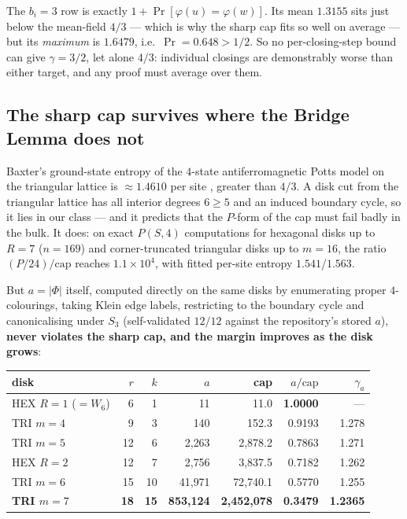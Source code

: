 \documentclass[11pt]{article}
\theoremstyle{definition}
\begin{document}
The $b_i=3$ row is exactly $1+\Pr[\varphi(u)=\varphi(w)]$. Its mean $1.3155$ sits
just below the mean-field $4/3$ --- which is why the sharp cap fits so well on average
--- but its \emph{maximum} is $1.6479$, i.e.\ $\Pr = 0.648 > 1/2$. So no per-closing-step
bound can give $\gamma=3/2$, let alone $4/3$: individual closings are demonstrably
worse than either target, and any proof must average over them.

\subsection{The sharp cap survives where the Bridge Lemma does not}

Baxter's ground-state entropy of the $4$-state antiferromagnetic Potts model on the
triangular lattice is $\approx 1.4610$ per site \cite{baxter1987}, greater than
$4/3$. A disk cut from the triangular lattice has all interior degrees $6 \ge 5$ and
an induced boundary cycle, so it lies in our class --- and it predicts that the
$P$-form of the cap must fail badly in the bulk. It does: on exact $P(S,4)$
computations for hexagonal disks up to $R=7$ ($n=169$) and corner-truncated
triangular disks up to $m=16$, the ratio $(P/24)/\text{cap}$ reaches
$1.1\times10^4$, with fitted per-site entropy $1.541$/$1.563$.

But $a=|\Phi|$ itself, computed directly on the same disks by enumerating proper
$4$-colourings, taking Klein edge labels, restricting to the boundary cycle and
canonicalising under $S_3$ (self-validated $12/12$ against the repository's stored
$a$), \textbf{never violates the sharp cap, and the margin improves as the disk
grows}:

\begin{center}\small
\begin{tabular}{lrrrrrr}
\toprule
disk & $r$ & $k$ & $a$ & cap & $a/\text{cap}$ & $\gamma_a$ \\
\midrule
HEX $R{=}1$ ($=W_6$) & 6 & 1 & 11 & 11.0 & \textbf{1.0000} & --- \\
TRI $m{=}4$ & 9 & 3 & 140 & 152.3 & 0.9193 & 1.278 \\
TRI $m{=}5$ & 12 & 6 & 2{,}263 & 2{,}878.2 & 0.7863 & 1.271 \\
HEX $R{=}2$ & 12 & 7 & 2{,}756 & 3{,}837.5 & 0.7182 & 1.262 \\
TRI $m{=}6$ & 15 & 10 & 41{,}971 & 72{,}740.1 & 0.5770 & 1.255 \\
\textbf{TRI $m{=}7$} & \textbf{18} & \textbf{15} & \textbf{853{,}124} & \textbf{2{,}452{,}078} & \textbf{0.3479} & \textbf{1.2365} \\
\bottomrule
\end{tabular}
\end{center}
\end{document}
